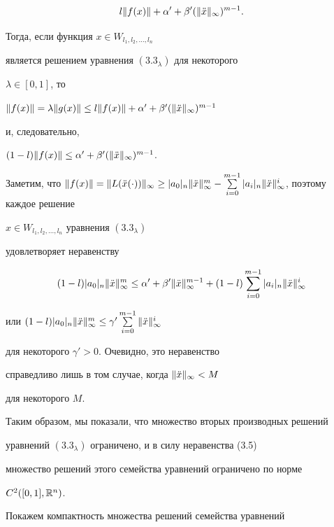 \begin{pf}
\begin{pf}
\begin{multline*}
l\|f(x)\| + \alpha' + \beta' (\|\Ddot x\|_\infty)^{m-1}.


\end{multline*}


Тогда, если функция $x\in W_{l_1, l_2, \dotsc, l_n}$ 


является решением уравнения $(3.3_\lambda)$ для некоторого


$\lambda\in [0,1]$, то 


$\|f(x)\|=\lambda \|g(x)\| \leq l \|f(x)\| + \alpha' +


\beta' (\|\Ddot x\|_\infty)^{m-1}$


и, следовательно,


$(1-l)\|f(x)\| \leq \alpha' + \beta'(\|\Ddot x\|_\infty)^{m-1}$.


Заметим, что $\|f(x)\| = \|L(\Ddot x(\cdot))\|


_\infty \geq |a_0|_n \|\Ddot x\|_\infty^m - \sum\limits_{i=0}^{m-1}


|a_i|_n \|\Ddot x\|_\infty^i$, поэтому каждое решение 


$x\in W_{l_1, l_2, \dotsc, l_n}$ уравнения $(3.3_\lambda)$


удовлетворяет неравенству


$$


(1-l)|a_0|_n \|\Ddot x\|_\infty^m \leq 


\alpha' + 


\beta'\|\Ddot x\|_\infty^{m-1} + (1-l) \sum\limits


_{i=0}^{m-1} |a_i|_n \|\Ddot x\|_\infty^i


$$


или $(1-l)|a_0|_n \|\Ddot x\|_\infty^m \leq 


\gamma'\sum\limits_{i=0}^{m-1}\|\Ddot x\|_\infty^i$ 


для некоторого $\gamma' >0$. Очевидно, это неравенство 


справедливо лишь в том случае, когда $\|\Ddot x\|_\infty < M$


для некоторого $M$.


Таким образом, мы показали, что множество вторых производных решений


уравнений $(3.3_\lambda)$ ограничено, и в силу неравенства (3.5) 


множество решений этого семейства уравнений ограничено по норме 


$C^2([0,1], {\Bbb R}^n)$.





Покажем компактность множества решений семейства уравнений



\end{pf}
\end{pf}
